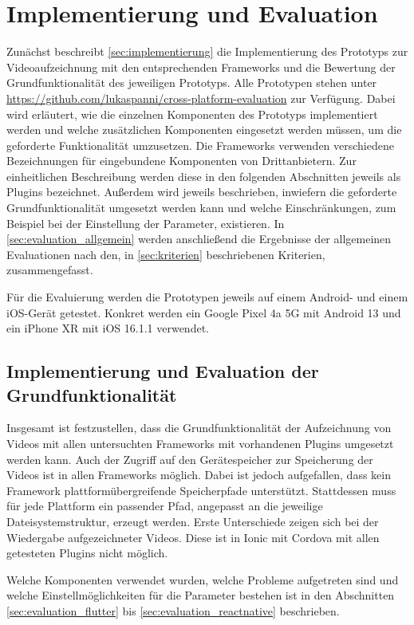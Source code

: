 \chapter{Implementierung und Evaluation}
\label{ch:evaluation}

Zunächst beschreibt \autoref{sec:implementierung} die Implementierung des Prototyps zur Videoaufzeichnung mit den entsprechenden Frameworks und die Bewertung der Grundfunktionalität des jeweiligen Prototyps.
Alle Prototypen stehen unter \url{https://github.com/lukaspanni/cross-platform-evaluation} zur Verfügung.
Dabei wird erläutert, wie die einzelnen Komponenten des Prototyps implementiert werden und welche zusätzlichen Komponenten eingesetzt werden müssen, um die geforderte Funktionalität umzusetzen.
Die Frameworks verwenden verschiedene Bezeichnungen für eingebundene Komponenten von Drittanbietern.
Zur einheitlichen Beschreibung werden diese in den folgenden Abschnitten jeweils als Plugins bezeichnet.
Außerdem wird jeweils beschrieben, inwiefern die geforderte Grundfunktionalität umgesetzt werden kann und welche Einschränkungen, zum Beispiel bei der Einstellung der Parameter, existieren.
In \autoref{sec:evaluation_allgemein} werden anschließend die Ergebnisse der allgemeinen Evaluationen nach den, in \autoref{sec:kriterien} beschriebenen Kriterien, zusammengefasst.

Für die Evaluierung werden die Prototypen jeweils auf einem Android- und einem iOS-Gerät getestet.
Konkret werden ein Google Pixel 4a 5G mit Android 13 und ein iPhone XR mit iOS 16.1.1 verwendet. 

\section{Implementierung und Evaluation der Grundfunktionalität}
\label{sec:implementierung}

Insgesamt ist festzustellen, dass die Grundfunktionalität der Aufzeichnung von Videos mit allen untersuchten Frameworks mit vorhandenen Plugins umgesetzt werden kann.
Auch der Zugriff auf den Gerätespeicher zur Speicherung der Videos ist in allen Frameworks möglich.
Dabei ist jedoch aufgefallen, dass kein Framework plattformübergreifende Speicherpfade unterstützt.
Stattdessen muss für jede Plattform ein passender Pfad, angepasst an die jeweilige Dateisystemstruktur, erzeugt werden.
Erste Unterschiede zeigen sich bei der Wiedergabe aufgezeichneter Videos.
Diese ist in Ionic mit Cordova mit allen getesteten Plugins nicht möglich.

Welche Komponenten verwendet wurden, welche Probleme aufgetreten sind und welche Einstellmöglichkeiten für die Parameter bestehen ist in den Abschnitten \ref{sec:evaluation_flutter} bis \ref{sec:evaluation_reactnative} beschrieben.

